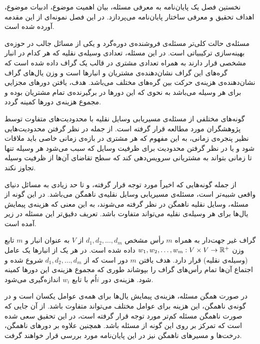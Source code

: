 


نخستین فصل یک پایان‌نامه به معرفی مسئله، بیان اهمیت موضوع، ادبیات موضوع،
اهداف تحقیق و معرفی ساختار پایان‌نامه می‌پردازد.
در این فصل نمونه‌ای از این مقدمه آورده شده است.



مسئله‌ی 
حالت کلی‌تر مسئله‌ی فروشنده‌ی دوره‌گرد و یکی از مسائل جالب در حوزه‌ی بهینه‌سازی ترکیبیاتی 
است. در این مسئله، تعدادی وسیله‌ی نقلیه که هر کدام در انبار مشخصی قرار دارند به همراه تعدادی مشتری در قالب یک گراف  داده شده است که گره‌های این گراف نشان‌دهنده‌ی مشتریان و انبارها است و وزن یال‌های گراف نشان‌دهنده‌ی هزینه‌ی حرکت بین گره‌های مختلف می‌باشد. هدف، یافتن دورهای مجزایی برای هر وسیله می‌باشد به نحوی که این دورها در برگیرنده‌ی تمام مشتریان بوده و مجموع هزینه‌ی دورها کمینه گردد.


گونه‌های مختلفی از مسئله‌ی مسیریابی وسایل نقلیه با محدودیت‌های متفاوت توسط پژوهشگران مورد مطالعه قرار گرفته است. از جمله در نظر گرفتن محدودیت‌هایی نظیر پنجره‌ی زمانی، به این مفهوم که هر مشتری در بازه‌ی زمانی خاصی باید ملاقات شود و یا در نظر گرفتن محدودیت برای ظرفیت وسایل که سبب می‌شود هر وسیله تنها تا زمانی بتواند به مشتریانی سرویس‌دهی کند که سطح تقاضای آن‌ها از ظرفیت وسیله تجاوز نکند. 

از جمله گونه‌هایی که اخیراً مورد توجه قرار گرفته، و تا حد زیادی به مسائل دنیای واقعی شبیه‌تر است، مسئله‌ی مسیریابی وسایل نقلیه‌ی ناهمگن می‌باشد. در این گونه از مسئله، وسایل نقلیه ناهمگن در نظر گرفته می‌شوند، به این معنی که هزینه‌ی پیمایش یال‌ها برای هر وسیله‌ی نقلیه می‌تواند متفاوت ‌باشد. 
تعریف دقیق‌تر این مسئله در زیر آمده است.


 گراف غیر جهت‌دار   به همراه $m$ رأس مشخص $d_1, d_2, \ldots, d_m$ از $V$ به عنوان انبار و $m$ تابع وزن $w_1, w_2, \ldots,  w_m: V \times V \rightarrow \mathbb{R}^+$ داده شده است. در هر یک از انبارها یک عامل (وسیله‌ی نقلیه) قرار دارد. هدف یافتن $m$ دور است که از $d_1, d_2, \ldots,  d_m$ شروع شده و اجتماع آن‌ها تمام رأس‌های گراف را بپوشاند طوری که مجموع هزینه‌ی این دورها کمینه شود.
 هزینه‌ی دور $i$اُم با تابع $w_i$ اندازه‌گیری می‌شود.
 
در صورت همگن مسئله، هزینه‌ی پیمایش یال‌ها برای همه‌ی عوامل یکسان است و در گونه‌ی ناهمگن،
این هزینه برای عوامل مختلف می‌تواند متفاوت باشد. 
از آن‌ جایی که صورت ناهمگن مسئله کم‌تر مورد توجه قرار گرفته است،
در این تحقیق سعی شده است که تمرکز بر روی این گونه از مسئله باشد.
همچنین علاوه بر دورهای ناهمگن، درخت‌ها و مسیرهای ناهمگن نیز در این پایان‌نامه مورد بررسی قرار خواهند گرفت.

